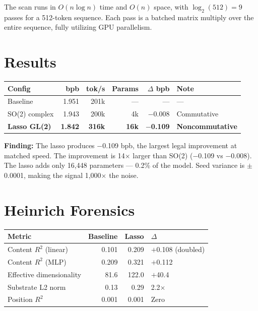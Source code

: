 \documentclass[11pt,a4paper]{report}
\newcommand{\finding}[1]{\textcolor{finding}{\textbf{Finding:}} #1}
\begin{document}
The scan runs in $O(n \log n)$ time and $O(n)$ space, with $\log_2(512) = 9$ passes for a 512-token sequence. Each pass is a batched matrix multiply over the entire sequence, fully utilizing GPU parallelism.

\section{Results}

\begin{center}
\begin{tabular}{lrrrrl}
\toprule
Config & bpb & tok/s & Params & $\Delta$ bpb & Note \\
\midrule
Baseline & 1.951 & 201k & --- & --- & --- \\
SO(2) complex & 1.943 & 200k & 4k & $-$0.008 & Commutative \\
\textbf{Lasso GL(2)} & \textbf{1.842} & \textbf{316k} & \textbf{16k} & $-$\textbf{0.109} & \textbf{Noncommutative} \\
\bottomrule
\end{tabular}
\end{center}

\finding{The lasso produces $-$0.109 bpb, the largest legal improvement at matched speed.} The improvement is 14$\times$ larger than SO(2) ($-$0.109 vs $-$0.008). The lasso adds only 16,448 parameters --- 0.2\% of the model. Seed variance is $\pm$0.0001, making the signal 1,000$\times$ the noise.

\section{Heinrich Forensics}

\begin{center}
\begin{tabular}{lrrl}
\toprule
Metric & Baseline & Lasso & $\Delta$ \\
\midrule
Content $R^2$ (linear) & 0.101 & 0.209 & $+$0.108 (doubled) \\
Content $R^2$ (MLP) & 0.209 & 0.321 & $+$0.112 \\
Effective dimensionality & 81.6 & 122.0 & $+$40.4 \\
Substrate L2 norm & 0.13 & 0.29 & 2.2$\times$ \\
Position $R^2$ & 0.001 & 0.001 & Zero \\
\bottomrule
\end{tabular}
\end{center}
\end{document}
